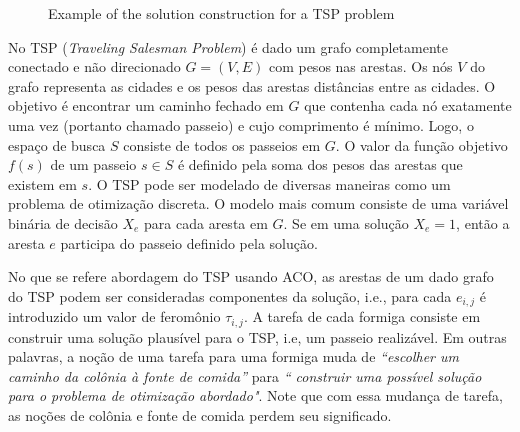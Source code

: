 \begin{figure}[ht]
  \label{img:exemp_aco}
  \caption{Example of the solution construction for a TSP problem}
\end{figure}

No TSP (\textit{Traveling Salesman Problem}) é dado um grafo completamente conectado e
não direcionado $G = (V , E)$ com pesos nas arestas.
Os nós $V$ do grafo representa as cidades e os pesos das arestas
distâncias entre as cidades. O objetivo é encontrar um caminho fechado em $G$
que contenha cada nó exatamente uma vez (portanto chamado passeio)
e cujo comprimento é mínimo. Logo, o espaço de busca $S$ consiste de todos os
passeios em $G$. O valor da função objetivo $f(s)$ de um passeio $s \in S$ 
é definido pela soma dos pesos das arestas que existem em $s$. O TSP pode ser
modelado de diversas maneiras como um problema de otimização discreta.
O modelo mais comum consiste de uma variável binária de decisão $X_e$ para
cada aresta em $G$.
Se em uma solução $X_e = 1$, então a aresta $e$ participa do passeio definido pela solução.

No que se refere abordagem do TSP usando ACO, 
as arestas de um dado grafo do TSP podem ser consideradas componentes da solução,
i.e., para cada $e_{i,j}$ é introduzido um valor de feromônio $\tau_{i,j}$. 
A tarefa de cada formiga consiste em construir uma solução plausível para o TSP, i.e,
um passeio realizável. Em outras palavras, a noção de uma tarefa para uma formiga
muda de \textit{“escolher um caminho da colônia à fonte de comida”} para \textit{“
construir uma possível solução para o problema de otimização abordado"}. Note que com essa
mudança de tarefa, as noções de colônia e fonte de comida perdem seu significado.

